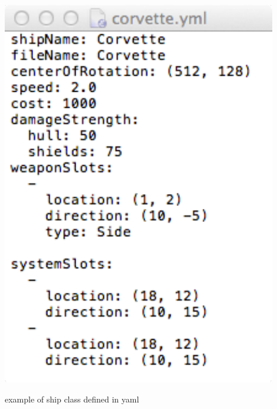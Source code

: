 \begin{marginfigure}
	\includegraphics{res/configuration/corvetteYaml.pdf}
	\caption{
	example of ship class defined in yaml
	}
	\label{fig:configuration:corvetteYaml}
\end{marginfigure}


